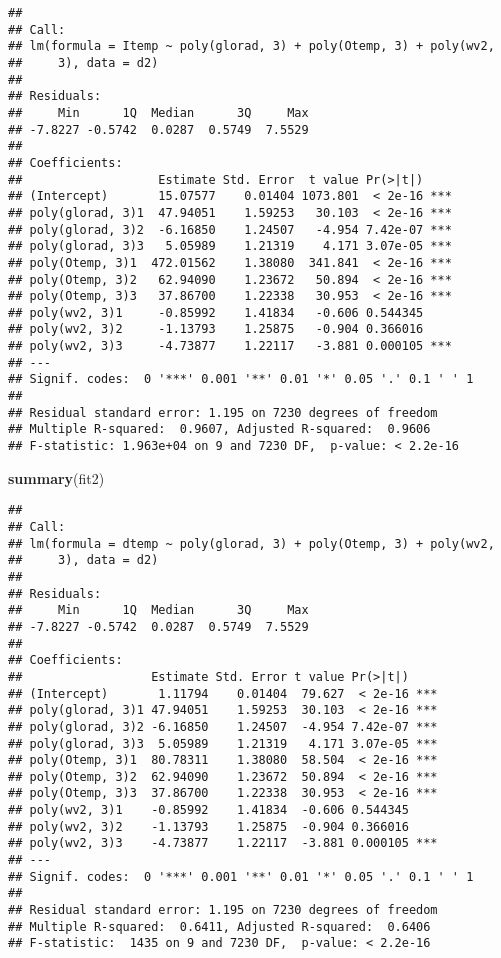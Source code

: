 \documentclass[
]{article}
\newenvironment{Shaded}{\begin{snugshade}}{\end{snugshade}}
\newcommand{\FunctionTok}[1]{\textcolor[rgb]{0.13,0.29,0.53}{\textbf{#1}}}
\newcommand{\NormalTok}[1]{#1}
\begin{document}
\begin{verbatim}
## 
## Call:
## lm(formula = Itemp ~ poly(glorad, 3) + poly(Otemp, 3) + poly(wv2, 
##     3), data = d2)
## 
## Residuals:
##     Min      1Q  Median      3Q     Max 
## -7.8227 -0.5742  0.0287  0.5749  7.5529 
## 
## Coefficients:
##                   Estimate Std. Error  t value Pr(>|t|)    
## (Intercept)       15.07577    0.01404 1073.801  < 2e-16 ***
## poly(glorad, 3)1  47.94051    1.59253   30.103  < 2e-16 ***
## poly(glorad, 3)2  -6.16850    1.24507   -4.954 7.42e-07 ***
## poly(glorad, 3)3   5.05989    1.21319    4.171 3.07e-05 ***
## poly(Otemp, 3)1  472.01562    1.38080  341.841  < 2e-16 ***
## poly(Otemp, 3)2   62.94090    1.23672   50.894  < 2e-16 ***
## poly(Otemp, 3)3   37.86700    1.22338   30.953  < 2e-16 ***
## poly(wv2, 3)1     -0.85992    1.41834   -0.606 0.544345    
## poly(wv2, 3)2     -1.13793    1.25875   -0.904 0.366016    
## poly(wv2, 3)3     -4.73877    1.22117   -3.881 0.000105 ***
## ---
## Signif. codes:  0 '***' 0.001 '**' 0.01 '*' 0.05 '.' 0.1 ' ' 1
## 
## Residual standard error: 1.195 on 7230 degrees of freedom
## Multiple R-squared:  0.9607, Adjusted R-squared:  0.9606 
## F-statistic: 1.963e+04 on 9 and 7230 DF,  p-value: < 2.2e-16
\end{verbatim}

\begin{Shaded}
\begin{Highlighting}[]
\FunctionTok{summary}\NormalTok{(fit2)}
\end{Highlighting}
\end{Shaded}

\begin{verbatim}
## 
## Call:
## lm(formula = dtemp ~ poly(glorad, 3) + poly(Otemp, 3) + poly(wv2, 
##     3), data = d2)
## 
## Residuals:
##     Min      1Q  Median      3Q     Max 
## -7.8227 -0.5742  0.0287  0.5749  7.5529 
## 
## Coefficients:
##                  Estimate Std. Error t value Pr(>|t|)    
## (Intercept)       1.11794    0.01404  79.627  < 2e-16 ***
## poly(glorad, 3)1 47.94051    1.59253  30.103  < 2e-16 ***
## poly(glorad, 3)2 -6.16850    1.24507  -4.954 7.42e-07 ***
## poly(glorad, 3)3  5.05989    1.21319   4.171 3.07e-05 ***
## poly(Otemp, 3)1  80.78311    1.38080  58.504  < 2e-16 ***
## poly(Otemp, 3)2  62.94090    1.23672  50.894  < 2e-16 ***
## poly(Otemp, 3)3  37.86700    1.22338  30.953  < 2e-16 ***
## poly(wv2, 3)1    -0.85992    1.41834  -0.606 0.544345    
## poly(wv2, 3)2    -1.13793    1.25875  -0.904 0.366016    
## poly(wv2, 3)3    -4.73877    1.22117  -3.881 0.000105 ***
## ---
## Signif. codes:  0 '***' 0.001 '**' 0.01 '*' 0.05 '.' 0.1 ' ' 1
## 
## Residual standard error: 1.195 on 7230 degrees of freedom
## Multiple R-squared:  0.6411, Adjusted R-squared:  0.6406 
## F-statistic:  1435 on 9 and 7230 DF,  p-value: < 2.2e-16
\end{verbatim}
\end{document}
